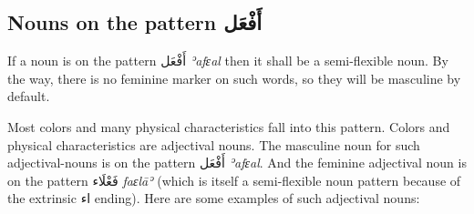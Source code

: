 \documentclass[
  10pt,
]{book}
\begin{document}
\subsection{\texorpdfstring{Nouns on the pattern \foreignlanguage{arabic}{أَفْعَل}}{Nouns on the pattern أَفْعَل}}\label{nouns-on-the-pattern-ux623ux641ux639ux644}

If a noun is on the pattern \foreignlanguage{arabic}{أَفْعَل} \emph{ʾafɛal} then it shall be a semi-flexible noun. By the way, there is no feminine marker on such words, so they will be masculine by default.

Most colors and many physical characteristics fall into this pattern. Colors and physical characteristics are adjectival nouns. The masculine noun for such adjectival-nouns is on the pattern \foreignlanguage{arabic}{أَفْعَل} \emph{ʾafɛal}. And the feminine adjectival noun is on the pattern \foreignlanguage{arabic}{فَعْلَاء} \emph{faɛlāʾ} (which is itself a semi-flexible noun pattern because of the extrinsic \foreignlanguage{arabic}{اء} ending). Here are some examples of such adjectival nouns:
\end{document}
